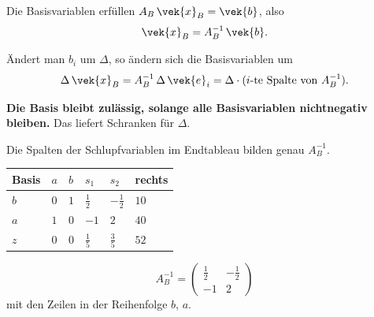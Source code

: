 \begin{merksatz}
Die Basisvariablen erfüllen $A_B\,\vek{x}_B = \vek{b}$, also
\[ \vek{x}_B = A_B^{-1}\,\vek{b} . \]

Ändert man $b_i$ um $\Delta$, so ändern sich die Basisvariablen um
\[ \Delta\,\vek{x}_B = A_B^{-1}\,\Delta\,\vek{e}_i = \Delta\cdot(\text{$i$-te Spalte von } A_B^{-1}) . \]

\begin{center}
\begin{minipage}{0.9\textwidth}
\textbf{Die Basis bleibt zulässig, solange alle Basisvariablen nichtnegativ bleiben.} Das liefert Schranken für $\Delta$.
\end{minipage}
\end{center}

Die Spalten der Schlupfvariablen im Endtableau bilden genau $A_B^{-1}$.

\begin{center}
{\small
\renewcommand{\arraystretch}{1.5}
\begin{tabular}{@{}P{1.6cm}P{1.4cm}P{1.4cm}P{1.4cm}P{1.4cm}P{1.4cm}@{}}
\toprule
\textbf{Basis} & $a$ & $b$ & $s_1$ & $s_2$ & \textbf{rechts}\\
\midrule
$b$ & $0$ & $1$ & $\tfrac12$ & $-\tfrac12$ & $10$\\
$a$ & $1$ & $0$ & $-1$ & $2$ & $40$\\
\midrule
$z$ & $0$ & $0$ & $\tfrac15$ & $\tfrac35$ & $52$\\
\bottomrule
\end{tabular}}
\end{center}

\[ A_B^{-1} = \begin{pmatrix} \tfrac12 & -\tfrac12\\ -1 & 2\end{pmatrix} \]
mit den Zeilen in der Reihenfolge $b$, $a$.
\end{merksatz}

